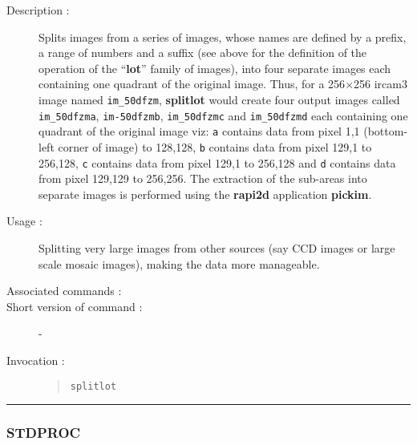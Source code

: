 \begin{description}

\item[Description :] Splits images from a series of images,
whose names are defined by a prefix, a range of numbers and a suffix
(see above for the definition of the operation of the ``{\bf lot}''
family of images), into four separate images each containing one
quadrant of the original image. Thus, for a 256$\times$256 {\sc ircam3}
image named {\tt im\_50dfzm}, {\bf splitlot} would create four output
images called {\tt im\_50dfzma}, {\tt im-50dfzmb}, {\tt im\_50dfzmc}
and {\tt im\_50dfzmd} each containing one quadrant of the original
image viz: {\tt a} contains data from pixel 1,1 (bottom-left corner of
image) to 128,128, {\tt b} contains data from pixel 129,1 to 256,128,
{\tt c} contains data from pixel 129,1 to 256,128 and {\tt d} contains
data from pixel 129,129 to 256,256.  The extraction of the sub-areas
into separate images is performed using the {\bf rapi2d} application
{\bf pickim}.

\item[Usage :] Splitting very large images from other sources
(say CCD images or large scale mosaic images), making the data more
manageable.

\item[Associated commands :] {\tt {}}
\item[Short version of command :] -
\item[Invocation :]

\begin{quote}{\tt  splitlot }\end{quote}

\end{description}

\hrule
\subsubsection*{\label{STDPROC}STDPROC}

